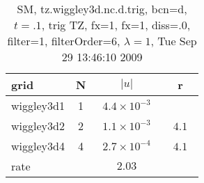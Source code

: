 \begin{table}[hbt]\tableFont %
\begin{center}
\begin{tabular}{|l|c|c|c|} \hline 
grid  & N &  $\vert u \vert$   & r \\ \hline 
          wiggley3d1 &     1 & ~$4.4\times10^{ -3}$~ &            \\ \hline
          wiggley3d2 &     2 & ~$1.1\times10^{ -3}$~ & ~$  4.1$~  \\ \hline
          wiggley3d4 &     4 & ~$2.7\times10^{ -4}$~ & ~$  4.1$~  \\ \hline
    rate             &       &       $2.03$         &        \\ \hline
\end{tabular}
\caption{SM, tz.wiggley3d.nc.d.trig, bcn=d, $t=.1$, trig TZ, fx=1, fx=1, diss=.0, filter=1, filterOrder=6, $\lambda=1$, Tue Sep 29 13:46:10 2009}\label{table:tz.wiggley3d.nc.d.trig}
\end{center}
\end{table}
